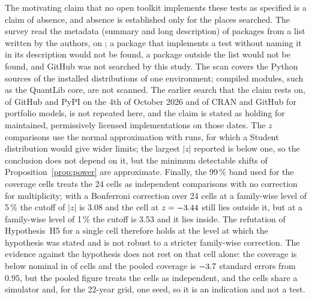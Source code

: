 The motivating claim that no open toolkit implements these tests as specified is a claim of absence, and absence is established only for the places searched. The survey read the metadata (summary and long description) of \pypiFound{} packages from a list written by the authors, on \pypiDate{}; a package that implements a test without naming it in its description would not be found, a package outside the list would not be found, and GitHub was not searched by this study. The scan covers the Python sources of the installed distributions of one environment; compiled modules, such as the QuantLib core, are not scanned. The earlier search that the claim rests on, of GitHub and PyPI on the 4th of October 2026 and of CRAN and GitHub for portfolio models, is not repeated here, and the claim is stated as holding for maintained, permissively licensed implementations on those dates. The $z$ comparisons use the normal approximation with \mcReps{} runs, for which a Student distribution would give wider limits; the largest $|z|$ reported is below one, so the conclusion does not depend on it, but the minimum detectable shifts of Proposition~\ref{prop:power} are approximate. Finally, the 99\,\% band used for the coverage cells treats the 24 cells as independent comparisons with no correction for multiplicity; with a Bonferroni correction over 24 cells at a family-wise level of 5\,\% the cutoff of $|z|$ is 3.08 and the cell at $z=-3.44{}$ still lies outside it, but at a family-wise level of 1\,\% the cutoff is 3.53 and it lies inside. The refutation of Hypothesis~H5 for a single cell therefore holds at the level at which the hypothesis was stated and is not robust to a stricter family-wise correction. The evidence against the hypothesis does not rest on that cell alone: the coverage is below nominal in \gridMlBelow{} of \gridMlCells{} cells and the pooled coverage is $-3.7{}$ standard errors from $0.95$, but the pooled figure treats the cells as independent, and the cells share a simulator and, for the 22-year grid, one seed, so it is an indication and not a test.
